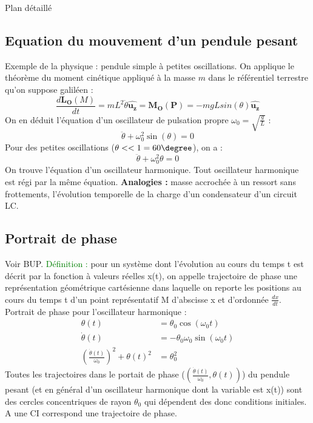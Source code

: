 \begin{reportBlock}{Plan détaillé}
  \subsection{Equation du mouvement d'un pendule pesant}
  Exemple de la physique : pendule simple à petites oscillations. On applique le théorème du moment cinétique appliqué à la masse $m$ dans le référentiel terrestre qu'on suppose galiléen :
  \begin{equation}
     \frac{d\mathbf{L_O}(M)}{dt} = mL^2\ddot{\theta}\mathbf{\hat{u_z}} = \mathbf{M_O}(\mathbf{P}) = -mgLsin(\theta)\mathbf{\hat{u_z}}
  \end{equation}
  On en déduit l'équation d'un oscillateur de pulsation propre $\omega_0=\sqrt{\frac{g}{L}}$ :
  \begin{equation}
      \ddot{\theta} + \omega_0^2\sin(\theta) = 0
  \end{equation}
  Pour des petites oscillations ($\theta<<1=60\degree$), on a :
  \begin{equation}
      \ddot{\theta} + \omega_0^2\theta = 0
  \end{equation}
  On trouve l'équation d'un oscillateur harmonique. Tout oscillateur harmonique est régi par la même équation. \textbf{Analogies :} masse accrochée à un ressort sans frottements, l'évolution temporelle de la charge d'un condensateur d'un circuit LC. 
  \subsection{Portrait de phase}
  Voir BUP. \textcolor{green}{Définition :} pour un système dont l’évolution au cours du temps t est décrit par la fonction à valeurs réelles x(t), on appelle trajectoire de phase une représentation géométrique cartésienne dans laquelle on reporte les positions au cours du temps t d’un point représentatif M d’abscisse x et d’ordonnée $\frac{dx}{dt}$.\\
  Portrait de phase pour l'oscillateur harmonique : 
  \begin{align}
      \theta(t) &= \theta_0\cos(\omega_0t) \\
      \dot{\theta}(t) &= -\theta_0\omega_0\sin(\omega_0t) \\
      \left(\frac{\dot{\theta}(t)}{\omega_0}\right)^2 + \theta(t)^2 &= \theta_0^2
  \end{align}
  Toutes les trajectoires dans le portait de phase ($(\frac{\dot{\theta}(t)}{\omega_0},\theta(t))$) du pendule pesant (et en général d'un oscillateur harmonique dont la variable est x(t)) sont des cercles concentriques de rayon $\theta_0$ qui dépendent des donc conditions initiales. A une CI correspond une trajectoire de phase.
  

\end{reportBlock}
